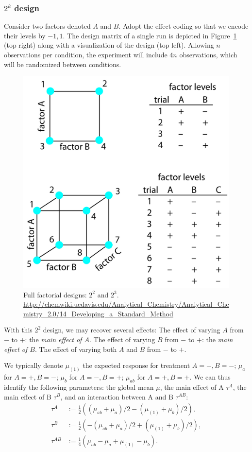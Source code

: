 \subsubsection{$2^k$ design}
Consider two factors denoted $A$ and $B$.
Adopt the effect coding so that we encode their levels by $-1,1$.
The design matrix of a single run is depicted in Figure~\ref{fig:full_factorial} (top right) along with a visualization of the design (top left).
Allowing $n$ observations per condition, the experiment will include $4n$ observations, which will be randomized between conditions.
\begin{figure}[ht]
\centering
\includegraphics[width=0.7\linewidth, height=0.3\textheight]{art/full_factorial}
\caption{Full factorial designs: $2^2$ and $2^3$. \newline \url{http://chemwiki.ucdavis.edu/Analytical_Chemistry/Analytical_Chemistry_2.0/14_Developing_a_Standard_Method}}
\label{fig:full_factorial}
\end{figure}
With this $2^2$ design, we may recover several effects:
The effect of varying $A$ from $-$ to $+$: the \emph{main effect of $A$}.
The effect of varying $B$ from $-$ to $+$: the \emph{main effect of $B$}.
The effect of varying both $A$ and $B$ from $-$ to $+$. 

We typically denote $\mu_{(1)}$ the expected response for treatment $A=-,B=-$; 
$\mu_a$ for $A=+,B=-$;
$\mu_b$ for $A=-,B=+$;
$\mu_{ab}$ for $A=+,B=+$.
We can thus identify the following parameters:
the global mean $\mu$, the main effect of A $\tau^A$, the main effect of B $\tau^B$, and an interaction between A and B $\tau^{AB}$:
\begin{align}
	\tau^A &:= \frac{1}{2}\left( (\mu_{ab}+\mu_a)/2- (\mu_{(1)}+\mu_b)/2\right), \\
	\tau^B &:= \frac{1}{2}\left( -(\mu_{ab}+\mu_a)/2 +  (\mu_{(1)}+\mu_b)/2\right), \\
	\tau^{AB} &:= \frac{1}{4}\left( \mu_{ab} - \mu_a +  \mu_{(1)} - \mu_b \right).	
\end{align}



